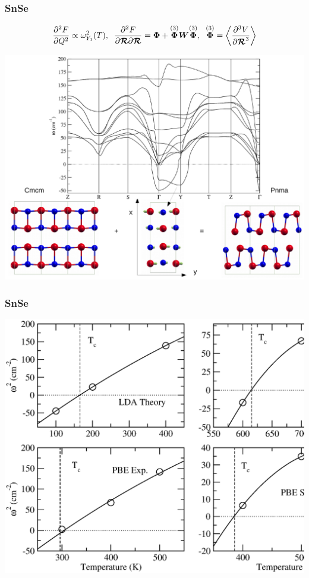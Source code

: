 \documentclass{beamer}
\begin{document}

\begin{frame}

\frametitle{SnSe}
\begin{equation}
  \frac{\partial^{2}F}{\partial Q^{2}}\propto\omega_{Y_{1}}^{2}(T), \hspace{0.2cm} \frac{\partial^{2}F}{\partial\boldsymbol{\mathcal{
  R}}\partial\boldsymbol{\mathcal{R}}}=\boldsymbol{\Phi}+\overset{(3)}{\boldsymbol{\Phi}}\boldsymbol{W}\overset{(3)}{\boldsymbol{\Phi}},
  \hspace{0.2cm} \overset{(3)}{\boldsymbol{\Phi}}=\left\langle\frac{\partial^{3}V}{\partial\boldsymbol{\mathcal{R}}^{3}}\right\rangle
 \nonumber
 \end{equation}
\begin{center}
  \includegraphics[width=0.7\linewidth]{Pictures/SnSe/figure3.pdf}
\end{center}

\end{frame}


\begin{frame}

\frametitle{SnSe}
\begin{center}
  \includegraphics[width=0.85\linewidth]{Pictures/SnSe/freq-main.eps}
\end{center}

\end{frame}
\end{document}
